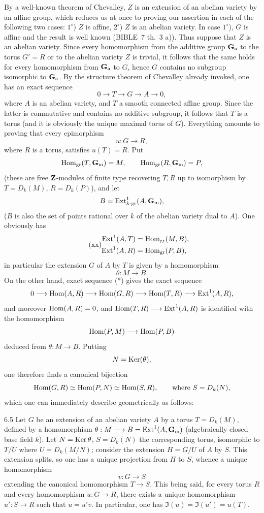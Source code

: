 By a well-known theorem of Chevalley, $Z$ is an extension of an abelian variety by an affine group, which reduces us at once to proving our assertion in each of the following two cases: $1^\circ$) $Z$ is affine, $2^\circ$) $Z$ is an abelian variety. In case $1^\circ$), $G$ is affine and the result is well known (BIBLE~7 th.~3 a)). Thus suppose that $Z$ is an abelian variety. Since every homomorphism from the additive group $\mathbf{G}_{\mathrm{a}}$ to the torus $G'=R$ or to the abelian variety $Z$ is trivial, it follows that the same holds for every homomorphism from $\mathbf{G}_{\mathrm{a}}$ to $G$, hence $G$ contains no subgroup isomorphic to $\mathbf{G}_{\mathrm{a}}$. By the structure theorem of Chevalley already invoked, one has an exact sequence
\begin{equation}\tag{*}
0\to T\to G\to A\to0,
\end{equation}
where $A$ is an abelian variety, and $T$ a smooth connected affine group. Since the latter is commutative and contains no additive subgroup, it follows that $T$ is a torus (and it is obviously the unique maximal torus of $G$). Everything amounts to proving that every epimorphism
\[
u:G\to R,
\]
where $R$ is a torus, satisfies $u(T)=R$. Put
\[
\operatorname{Hom}_{\mathrm{gr}}(T,\mathbf{G}_{\mathrm{m}})=M,\qquad\operatorname{Hom}_{\mathrm{gr}}(R,\mathbf{G}_{\mathrm{m}})=P,
\]
(these are free $\mathbf{Z}$-modules of finite type recovering $T,R$ up to isomorphism by $T=D_k(M)$, $R=D_k(P)$), and let
\[
B=\operatorname{Ext}^1_{k\text{-gr}}(A,\mathbf{G}_{\mathrm{m}}),
\]
($B$ is also the set of points rational over $k$ of the abelian variety dual to $A$). One obviously has
\begin{equation}\tag{xx}
\begin{aligned}
\operatorname{Ext}^1(A,T)&=\operatorname{Hom}_{\mathrm{gr}}(M,B),\\
\operatorname{Ext}^1(A,R)&=\operatorname{Hom}_{\mathrm{gr}}(P,B),
\end{aligned}
\end{equation}
in particular the extension $G$ of $A$ by $T$ is given by a homomorphism
\[
\theta:M\to B.
\]
On the other hand, exact sequence (*) gives the exact sequence
\[
0\longrightarrow\operatorname{Hom}(A,R)\longrightarrow\operatorname{Hom}(G,R)\longrightarrow\operatorname{Hom}(T,R)\longrightarrow\operatorname{Ext}^1(A,R),
\]
and moreover $\operatorname{Hom}(A,R)=0$, and $\operatorname{Hom}(T,R)\longrightarrow\operatorname{Ext}^1(A,R)$ is identified with the homomorphism
\[
\operatorname{Hom}(P,M)\longrightarrow\operatorname{Hom}(P,B)
\]
deduced from $\theta:M\to B$. Putting
\[
N=\operatorname{Ker}(\theta),
\]
one therefore finds a canonical bijection
\[
\operatorname{Hom}(G,R)\simeq\operatorname{Hom}(P,N)\simeq\operatorname{Hom}(S,R),\qquad\text{where }S=D_k(N),
\]
which one can immediately describe geometrically as follows:
\begin{lemma}{6.5}\label{XII.6.5}
Let $G$ be an extension of an abelian variety $A$ by a torus $T=D_k(M)$, defined by a homomorphism $\theta:M\longrightarrow B=\operatorname{Ext}^1(A,\mathbf{G}_{\mathrm{m}})$ (algebraically closed base field $k$). Let $N=\operatorname{Ker}\theta$, $S=D_k(N)$ the corresponding torus, isomorphic to $T/U$ where $U=D_k(M/N)$; consider the extension $H=G/U$ of $A$ by $S$. This extension splits, so one has a unique projection from $H$ to $S$, whence a unique homomorphism
\[
v:G\to S
\]
extending the canonical homomorphism $T\to S$. This being said, for every torus $R$ and every homomorphism $u:G\to R$, there exists a unique homomorphism $u':S\to R$ such that $u=u'v$. In particular, one has $\Im(u)=\Im(u')=u(T)$.
\end{lemma}

